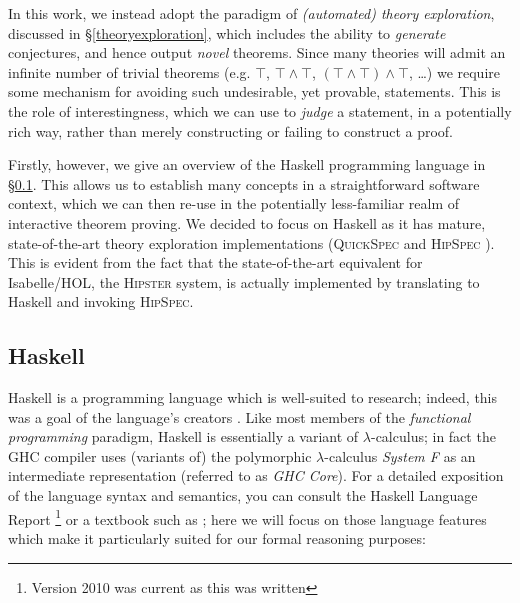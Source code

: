 \documentclass[]{article}
\begin{document}
In this work, we instead adopt the paradigm of \emph{(automated) theory exploration}, discussed in \S \ref{theoryexploration}, which includes the ability to \emph{generate} conjectures, and hence output \emph{novel} theorems. Since many theories will admit an infinite number of trivial theorems (e.g. $\top$, $\top \land \top$, $(\top \land \top) \land \top$, \dots) we require some mechanism for avoiding such undesirable, yet provable, statements. This is the role of interestingness, which we can use to \emph{judge} a statement, in a potentially rich way, rather than merely constructing or failing to construct a proof.

Firstly, however, we give an overview of the Haskell programming language in \S \ref{haskell}. This allows us to establish many concepts in a straightforward software context, which we can then re-use in the potentially less-familiar realm of interactive theorem proving. We decided to focus on Haskell as it has mature, state-of-the-art theory exploration implementations (\textsc{QuickSpec} \cite{QuickSpec} and \textsc{HipSpec} \cite{claessen2013automating}). This is evident from the fact that the state-of-the-art equivalent for Isabelle/HOL, the \textsc{Hipster} \cite{Hipster} system, is actually implemented by translating to Haskell and invoking \textsc{HipSpec}.

\subsection{Haskell}\label{haskell}


\providecommand{\hs}[1]{\lstinline[language=Haskell]|#1|}

Haskell is a programming language which is well-suited to research; indeed, this was a goal of the language's creators \cite{marlow2010haskell}. Like most members of the \emph{functional programming} paradigm, Haskell is essentially a variant of $\lambda$-calculus; in fact the \textsc{GHC} compiler uses (variants of) the polymorphic $\lambda$-calculus \emph{System F} as an intermediate representation (referred to as \emph{GHC Core}). For a detailed exposition of the language syntax and semantics, you can consult the Haskell Language Report \cite{marlow2010haskell} \footnote{Version 2010 was current as this was written} or a textbook such as \cite{thompson1999haskell}; here we will focus on those language features which make it particularly suited for our formal reasoning purposes:
\end{document}
